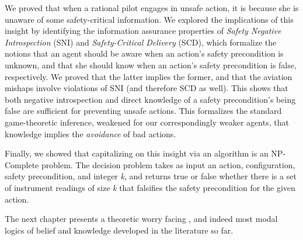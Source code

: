 We proved that when a rational pilot engages in unsafe action, it is because she is unaware of some safety-critical information. We explored the implications of this insight by identifying the information assurance properties of \emph{Safety Negative Introspection} (SNI) and \emph{Safety-Critical Delivery} (SCD), which formalize the notions that an agent should be aware when an action's safety precondition is unknown, and that she should know when an action's safety precondition is false, respectively. We proved that the latter implies the former, and that the aviation mishaps involve violations of SNI (and therefore SCD as well). This shows that both negative introspection and direct knowledge of a safety precondition's being false are sufficient for preventing unsafe actions. This formalizes the standard game-theoretic inference, weakened for our correspondingly weaker agents, that knowledge implies the \emph{avoidance} of bad actions.

Finally, we showed that capitalizing on this insight via an algorithm is an NP-Complete problem. The decision problem takes as input an action, configuration, safety precondition, and integer \emph{k}, and returns true or false whether there is a set of instrument readings of size \emph{k} that falsifies the safety precondition for the given action.

The next chapter presents a theoretic worry facing \DASL, and indeed most modal logics of belief and knowledge developed in the literature so far. 

	
